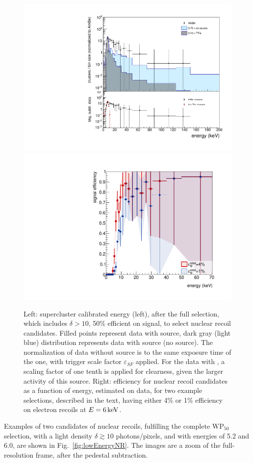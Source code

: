%
\begin{figure}[ht]
  \begin{center}
    \includegraphics[width=0.45\linewidth]{figures/energyFull_WP50}
    \includegraphics[width=0.45\linewidth]{figures/energyFull_effi}

    \caption{Left: supercluster calibrated energy (left), after the
      full selection, which includes $\delta>10$, 50\% efficient on
      signal, to select nuclear recoil candidates. Filled points
      represent data with \ambe source, dark gray (light blue)
      distribution represents data with \fe source (no source).  The
      normalization of data without source is to the same exposure
      time of the \ambe one, with trigger scale factor
      $\varepsilon_{SF}$ applied. For the data with \fe, a scaling
      factor of one tenth is applied for clearness, given the larger
      activity of this source. Right: efficiency for nuclear recoil
      candidates as a function of energy, estimated on \ambe data, for
      two example selections, described in the text, having either 4\%
      or 1\% efficiency on electron recoils at
      $E=6\,\textrm{ke\hspace{-.08em}V}$. \label{fig:fullsel_effi}}

  \end{center}
\end{figure}

Examples of two candidates of nuclear recoils, fulfilling the complete
$\mathrm{WP}_{50}$ selection, with a light density $\delta\gtrsim10$
photons/pixels, and with energies of 5.2 and 6.0\keV, are shown in
Fig.~\ref{fig:lowEnergyNR}. The images are a zoom of the
full-resolution frame, after the pedestal subtraction.

